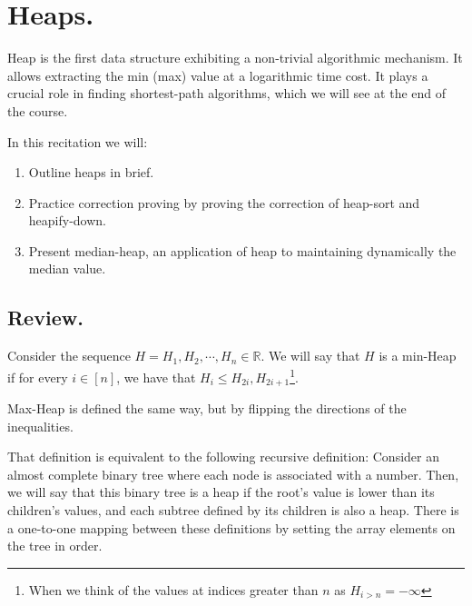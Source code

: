 


\ifdefined\BOOK
\else
\setcounter{chapter}{5}
\fi

\chapter{Heaps.} 
Heap is the first data structure exhibiting a non-trivial algorithmic mechanism. It allows extracting the min (max) value at a logarithmic time cost. It plays a crucial role in finding shortest-path algorithms, which we will see at the end of the course. 

In this recitation we will: 
\begin{enumerate}
  \item Outline heaps in brief. 
  \item Practice correction proving by proving the correction of heap-sort and heapify-down. 
  \item Present median-heap, an application of heap to maintaining dynamically the median value.
\end{enumerate}

\section{Review.}
  \begin{definition}    
    Consider the sequence $H = H_{1}, H_{2}, \cdots, H_{n} \in \mathbb{R}$. We will say that $H$ is a min-Heap if for every $i \in [n]$, we have that $H_{i} \le H_{2i}, H_{2i + 1}$\footnote{When we think of the values at indices greater than $n$ as $H_{i>n} = -\infty$}.


Max-Heap is defined the same way, but by flipping the directions of the inequalities.
  \end{definition}

That definition is equivalent to the following recursive definition: Consider an almost complete binary tree where each node is associated with a number. Then, we will say that this binary tree is a heap if the root's value is lower than its children's values, and each subtree defined by its children is also a heap. There is a one-to-one mapping between these definitions by setting the array elements on the tree in order.


